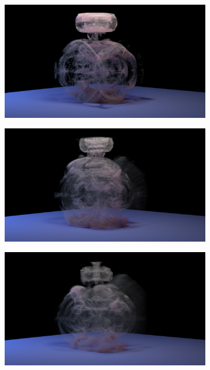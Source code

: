 \documentclass[11pt]{article}
\begin{document}
\begin{figure}
\begin{subfigure}[h]{0.5\textwidth}
	\end{subfigure}
	\begin{subfigure}[h]{0.5\textwidth}
		\centering
		\includegraphics[width=\textwidth]{Figures/renders/plume0014.png}
	\end{subfigure}
	\begin{subfigure}[h]{0.5\textwidth}
		\centering
		\includegraphics[width=\textwidth]{Figures/renders/plume0021.png}	
	\end{subfigure}
	\begin{subfigure}[h]{0.5\textwidth}
		\centering
		\includegraphics[width=\textwidth]{Figures/renders/plume0030.png}

\end{subfigure}
\end{figure}
\end{document}
